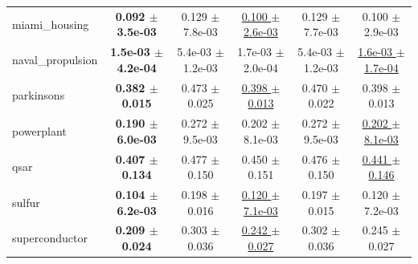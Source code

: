 \begin{table}[!htbp]
{\begin{tabular}{lccccc}
miami\_housing & \textbf{0.092 $\pm$ 3.5e-03} & 0.129 $\pm$ 7.8e-03 & \underline{0.100 $\pm$ 2.6e-03} & 0.129 $\pm$ 7.7e-03 & 0.100 $\pm$ 2.9e-03 \\
naval\_propulsion & \textbf{1.5e-03 $\pm$ 4.2e-04} & 5.4e-03 $\pm$ 1.2e-03 & 1.7e-03 $\pm$ 2.0e-04 & 5.4e-03 $\pm$ 1.2e-03 & \underline{1.6e-03 $\pm$ 1.7e-04} \\
parkinsons & \textbf{0.382 $\pm$ 0.015} & 0.473 $\pm$ 0.025 & \underline{0.398 $\pm$ 0.013} & 0.470 $\pm$ 0.022 & 0.398 $\pm$ 0.013 \\
powerplant & \textbf{0.190 $\pm$ 6.0e-03} & 0.272 $\pm$ 9.5e-03 & 0.202 $\pm$ 8.1e-03 & 0.272 $\pm$ 9.5e-03 & \underline{0.202 $\pm$ 8.1e-03} \\
qsar & \textbf{0.407 $\pm$ 0.134} & 0.477 $\pm$ 0.150 & 0.450 $\pm$ 0.151 & 0.476 $\pm$ 0.150 & \underline{0.441 $\pm$ 0.146} \\
sulfur & \textbf{0.104 $\pm$ 6.2e-03} & 0.198 $\pm$ 0.016 & \underline{0.120 $\pm$ 7.1e-03} & 0.197 $\pm$ 0.015 & 0.120 $\pm$ 7.2e-03 \\
superconductor & \textbf{0.209 $\pm$ 0.024} & 0.303 $\pm$ 0.036 & \underline{0.242 $\pm$ 0.027} & 0.302 $\pm$ 0.036 & 0.245 $\pm$ 0.027 \\
\bottomrule
\end{tabular}
}
\end{table}